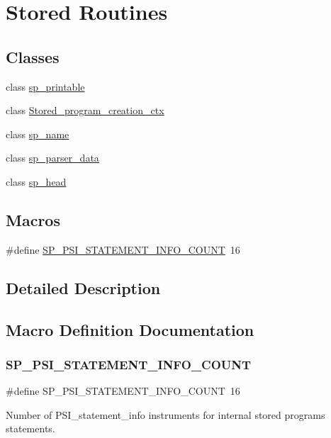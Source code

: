 \hypertarget{group__Stored__Routines}{}\section{Stored Routines}
\label{group__Stored__Routines}
\subsection*{Classes}
\begin{DoxyCompactItemize}
\item 
class \mbox{\hyperlink{classsp__printable}{sp\+\_\+printable}}
\item 
class \mbox{\hyperlink{classStored__program__creation__ctx}{Stored\+\_\+program\+\_\+creation\+\_\+ctx}}
\item 
class \mbox{\hyperlink{classsp__name}{sp\+\_\+name}}
\item 
class \mbox{\hyperlink{classsp__parser__data}{sp\+\_\+parser\+\_\+data}}
\item 
class \mbox{\hyperlink{classsp__head}{sp\+\_\+head}}
\end{DoxyCompactItemize}
\subsection*{Macros}
\begin{DoxyCompactItemize}
\item 
\#define \mbox{\hyperlink{group__Stored__Routines_gaf0a6cef4120270902977ae80a0c00710}{S\+P\+\_\+\+P\+S\+I\+\_\+\+S\+T\+A\+T\+E\+M\+E\+N\+T\+\_\+\+I\+N\+F\+O\+\_\+\+C\+O\+U\+NT}}~16
\end{DoxyCompactItemize}


\subsection{Detailed Description}


\subsection{Macro Definition Documentation}
\mbox{\label{group__Stored__Routines_gaf0a6cef4120270902977ae80a0c00710}} 
\subsubsection{\texorpdfstring{S\+P\+\_\+\+P\+S\+I\+\_\+\+S\+T\+A\+T\+E\+M\+E\+N\+T\+\_\+\+I\+N\+F\+O\+\_\+\+C\+O\+U\+NT}{SP\_PSI\_STATEMENT\_INFO\_COUNT}}
{\footnotesize\ttfamily \#define S\+P\+\_\+\+P\+S\+I\+\_\+\+S\+T\+A\+T\+E\+M\+E\+N\+T\+\_\+\+I\+N\+F\+O\+\_\+\+C\+O\+U\+NT~16}

Number of P\+S\+I\+\_\+statement\+\_\+info instruments for internal stored programs statements. 